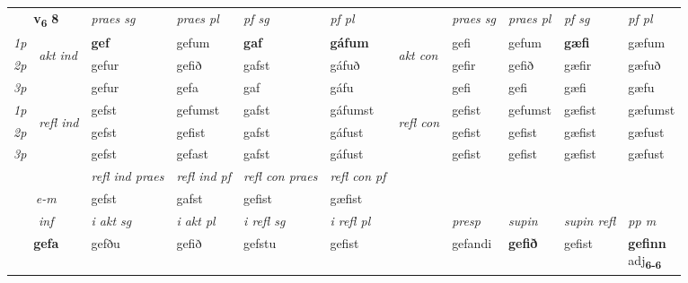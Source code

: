 \noindent
\begin{tabular}{lllllllllll} \toprule
\multicolumn{2}{c}{\textbf{v{\textsubscript{6}}} \Large{\textbf{8}}}  &  \textit{praes sg}  & \textit{praes pl}  &\textit{ pf sg} & \textit{pf pl} &  &  \textit{praes sg}  & \textit{praes pl}  & \textit{pf sg} & \textit{pf pl } \\*
	\cmidrule{3-6} \cmidrule{8-11}
 {\textit{1p}} & \multirow{3}{*}{\begin{turn}{90}\textit{akt ind}\end{turn}} & \textbf{gef} & gefum & \textbf{gaf} & \textbf{gáfum} & \multirow{3}{*}{\begin{turn}{90}\textit{akt con}\end{turn}} &gefi & gefum & \textbf{gæfi} & gæfum\\*
 {\textit{2p}} &  &  gefur  & gefið & gafst & gáfuð & & gefir & gefið & gæfir & gæfuð \\*
{\textit{3p}} &  & gefur & gefa & gaf & gáfu & & gefi & gefi& gæfi & gæfu \\*
\cmidrule{3-6} \cmidrule{8-11}
 {\textit{1p}} & \multirow{3}{*}{\begin{turn}{90}\textit{refl ind}\end{turn}}  & gefst & gefumst & gafst & gáfumst & \multirow{3}{*}{\begin{turn}{90}\textit{refl con}\end{turn}}  &gefist & gefumst & gæfist & gæfumst \\*
 {\textit{2p}} &  & gefst & gefist & gafst & gáfust & &gefist & gefist & gæfist & gæfust \\*
 {\textit{3p}}  & & gefst & gefast & gafst & gáfust & & gefist & gefist& gæfist & gæfust \\*
\cmidrule{3-6} \cmidrule{8-11}

 & & \textit{refl ind praes} & \textit{refl ind pf} & \textit{refl con praes} & \textit{refl con pf} \\*
 \multicolumn{2}{c}{ \textit{e-m} }& gefst & gafst & gefist & gæfist \\*

\cmidrule{3-11}
   \multicolumn{2}{c}{\textit{inf}}  & \textit{i akt sg} & \textit{i akt pl} & \textit{i refl sg} & \textit{i refl pl} && \textit{presp} & \textit{supin} & \textit{supin refl} & \textit{pp m} \\*
  \multicolumn{2}{c}{\textbf{gefa}} & gefðu  & gefið & gefstu & gefist && gefandi &  \textbf{gefið} & gefist & \specialcell{\textbf{gefinn} \\ adj\textbf{\textsubscript{6-6}}} \\*
\end{tabular}


